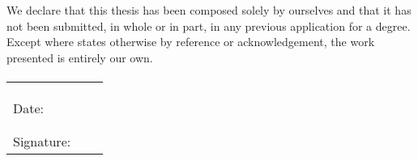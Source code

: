 
\cleardoublepage  %


We declare that this thesis has been composed solely by ourselves and that it has not been submitted, in whole or in part, in any previous application for a degree. 
Except where states otherwise by reference or acknowledgement, the work presented is entirely our
own.

\paragraph{}
\begin{tabular}{lcc}

	& \AuthorA & \AuthorB \\
	& \AuthorAID & \AuthorBID \\
	
	& & \\ %
	
	Date: &  \dotfill & \dotfill \\ 
	
	& & \\ %
	& & \\ %
	
	Signature: & \dotfill & \dotfill \\ 
	
\end{tabular}